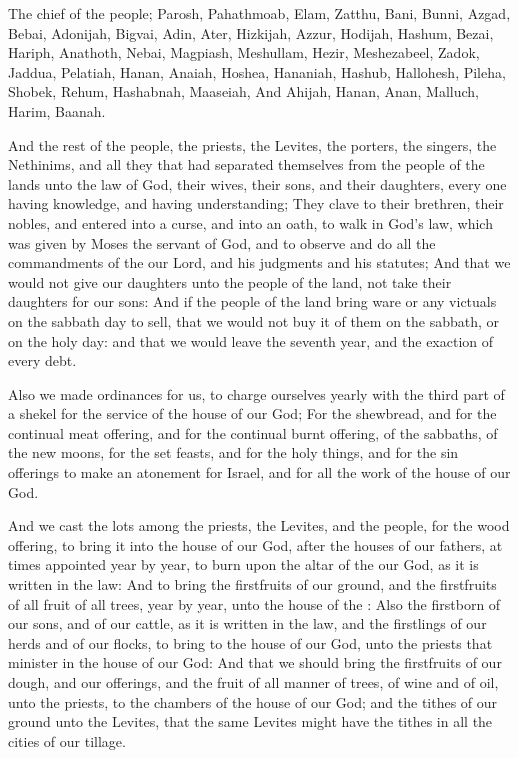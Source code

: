 \verse The chief of the people; Parosh, Pahathmoab, Elam, Zatthu, Bani, \verse Bunni, Azgad, Bebai, \verse Adonijah, Bigvai, Adin, \verse Ater, Hizkijah, Azzur, \verse Hodijah, Hashum, Bezai, \verse Hariph, Anathoth, Nebai, \verse Magpiash, Meshullam, Hezir, \verse Meshezabeel, Zadok, Jaddua, \verse Pelatiah, Hanan, Anaiah, \verse Hoshea, Hananiah, Hashub, \verse Hallohesh, Pileha, Shobek, \verse Rehum, Hashabnah, Maaseiah, \verse And Ahijah, Hanan, Anan, \verse Malluch, Harim, Baanah.

\verse And the rest of the people, the priests, the Levites, the porters, the singers, the Nethinims, and all they that had separated themselves from the people of the lands unto the law of God, their wives, their sons, and their daughters, every one having knowledge, and having understanding; \verse They clave to their brethren, their nobles, and entered into a curse, and into an oath, to walk in God's law, which was given by Moses the servant of God, and to observe and do all the commandments of the \LORD our Lord, and his judgments and his statutes; \verse And that we would not give our daughters unto the people of the land, not take their daughters for our sons: \verse And if the people of the land bring ware or any victuals on the sabbath day to sell, that we would not buy it of them on the sabbath, or on the holy day: and that we would leave the seventh year, and the exaction of every debt.

\verse Also we made ordinances for us, to charge ourselves yearly with the third part of a shekel for the service of the house of our God; \verse For the shewbread, and for the continual meat offering, and for the continual burnt offering, of the sabbaths, of the new moons, for the set feasts, and for the holy things, and for the sin offerings to make an atonement for Israel, and for all the work of the house of our God.

\verse And we cast the lots among the priests, the Levites, and the people, for the wood offering, to bring it into the house of our God, after the houses of our fathers, at times appointed year by year, to burn upon the altar of the \LORD our God, as it is written in the law: \verse And to bring the firstfruits of our ground, and the firstfruits of all fruit of all trees, year by year, unto the house of the \LORD: \verse Also the firstborn of our sons, and of our cattle, as it is written in the law, and the firstlings of our herds and of our flocks, to bring to the house of our God, unto the priests that minister in the house of our God: \verse And that we should bring the firstfruits of our dough, and our offerings, and the fruit of all manner of trees, of wine and of oil, unto the priests, to the chambers of the house of our God; and the tithes of our ground unto the Levites, that the same Levites might have the tithes in all the cities of our tillage.

